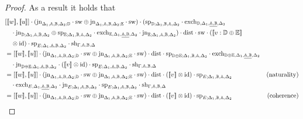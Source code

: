 \documentclass[10pt,a4paper]{amsart}
\theoremstyle{definition}
\theoremstyle{definition}
\theoremstyle{definition}
\theoremstyle{definition}
\theoremstyle{definition}
\theoremstyle{definition}
\begin{document}
\begin{proof}
As a result it holds that 
\begin{align*}
  & [[\![ w ]\!] ,  [\![u ]\!]] \comp  (\text{jn}_{\Delta_{1},\typeA,\typeB,  \Delta_{2};\typeD} \comp \sw \oplus \text{jn}_{\Delta_{1},\typeA,\typeB,  \Delta_{2};\typeE} \comp \sw ) \comp (\text{sp}_{\typeD;\Delta_{1}, \typeB, \typeA, \Delta_{2}} \comp  \text{exch}_{\typeD, \Delta_{1},\underline{\typeA,\typeB},  \Delta_{2}}   \\
  & \hspace{10pt} \comp \text{jn}_{\typeD;\Delta_{1},\typeA,\typeB,  \Delta_{2}} \oplus \text{sp}_{\typeE;\Delta_{1}, \typeB, \typeA, \Delta_{2}} \comp  \text{exch}_{\typeE, \Delta_{1},\underline{\typeA,\typeB},  \Delta_{2}} \comp \text{jn}_{\typeE;\Delta_{1},\typeA,\typeB,  \Delta_{2}} )   \comp \dist \comp \sw \comp ([\![  v : \typeD \oplus \typeE  ]\!]  \\
  & \hspace{10pt} \otimes \text{id})  \comp\text{sp}_{E; \Delta_{1},\typeA,\typeB,  \Delta_{2}} \comp \text{sh}_{\Gamma,\typeA, \typeB,\Delta} \\
  & = [[\![ w ]\!] ,  [\![u ]\!]] \comp  (\text{jn}_{\Delta_{1},\typeA,\typeB,  \Delta_{2};\typeD} \comp \sw \oplus \text{jn}_{\Delta_{1},\typeA,\typeB,  \Delta_{2};\typeE} \comp \sw ) \comp \dist \comp \text{sp}_{\typeD \oplus \typeE;\Delta_{1}, \typeB, \typeA, \Delta_{2}} \comp  \text{exch}_{\typeD \oplus \typeE, \Delta_{1},\underline{\typeA,\typeB},  \Delta_{2}} \\
  & \hspace{10pt} \comp \text{jn}_{\typeD \oplus \typeE;\Delta_{1},\typeA,\typeB,  \Delta_{2}} \comp ([\![  v ]\!] \otimes \text{id})  \comp\text{sp}_{E; \Delta_{1},\typeA,\typeB,  \Delta_{2}} \comp \text{sh}_{\Gamma,\typeA, \typeB,\Delta}\\
  & = [[\![ w ]\!] ,  [\![u ]\!]] \comp  (\text{jn}_{\Delta_{1},\typeA,\typeB,  \Delta_{2};\typeD} \comp \sw \oplus \text{jn}_{\Delta_{1},\typeA,\typeB,  \Delta_{2};\typeE} \comp \sw ) \comp \dist  \comp ([\![  v  ]\!] \otimes \text{id}) \comp \text{sp}_{E;\Delta_{1}, \typeB, \typeA, \Delta_{2}} & {\text{(naturality)}} \\
  & \hspace{10pt}  \comp  \text{exch}_{E, \Delta_{1},\underline{\typeA,\typeB},  \Delta_{2}} \comp  \text{jn}_{E ;\Delta_{1},\typeA,\typeB,  \Delta_{2}}   \comp\text{sp}_{E; \Delta_{1},\typeA,\typeB,  \Delta_{2}} \comp \text{sh}_{\Gamma,\typeA, \typeB,\Delta} \\
  & = [[\![ w ]\!] ,  [\![u ]\!]] \comp  (\text{jn}_{\Delta_{1},\typeA,\typeB,  \Delta_{2};\typeD} \comp \sw \oplus \text{jn}_{\Delta_{1},\typeA,\typeB,  \Delta_{2};\typeE} \comp \sw ) \comp \dist  \comp ([\![  v  ]\!] \otimes \text{id}) \comp \text{sp}_{E; \Delta_{1}, \typeB,\typeA,  \Delta_{2}} & {\text{(coherence)}} \\

\end{align*}
\end{proof}
\end{document}
